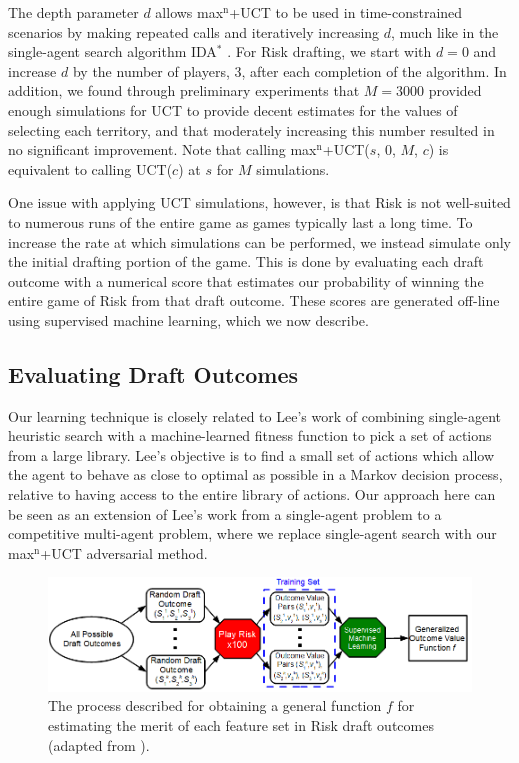 \documentclass[letterpaper]{article}
\numberwithin{equation}{section}
\numberwithin{theorem}{section}
\numberwithin{lemma}{section}
\numberwithin{df}{section}
\begin{document}
The depth parameter $d$ allows max$^\text{n}$+UCT to be used in time-constrained scenarios by making repeated calls and iteratively increasing $d$, much like in the single-agent search algorithm IDA$^*$ \cite{IdaStar}.  For Risk drafting, we start with $d = 0$ and increase $d$ by the number of players, 3, after each completion of the algorithm.  In addition, we found through preliminary experiments that $M = 3000$ provided enough simulations for UCT to provide decent estimates for the values of selecting each territory, and that moderately increasing this number resulted in no significant improvement.  Note that calling max$^\text{n}$+UCT($s$, $0$, $M$, $c$) is equivalent to calling UCT($c$) at $s$ for $M$ simulations.  

One issue with applying UCT simulations, however, is that Risk is not well-suited to numerous runs of the entire game as games typically last a long time.  To increase the rate at which simulations can be performed, we instead simulate only the initial drafting portion of the game.  This is done by evaluating each draft outcome with a numerical score that estimates our probability of winning the entire game of Risk from that draft outcome.  These scores are generated off-line using supervised machine learning, which we now describe.

\subsection{Evaluating Draft Outcomes}

Our learning technique is closely related to Lee's work \cite{GregLeeThesis} of combining single-agent heuristic search with a machine-learned fitness function to pick a set of actions from a large library.  Lee's objective is to find a small set of actions which allow the agent to behave as close to optimal as possible in a Markov decision process, relative to having access to the entire library of actions.  Our approach here can be seen as an extension of Lee's work from a single-agent problem to a competitive multi-agent problem, where we replace single-agent search with our max$^\text{n}$+UCT adversarial method. 

\begin{figure}[t]
	\centering
	\includegraphics[scale=0.5]{../ForPublication/figs/MachineLearner.png}
	\caption{The process described for obtaining a general function $f$ for estimating the merit of each feature set in Risk draft outcomes (adapted from \cite[Figure 5.1]{GregLeeThesis}).}
	\label{fig:MachLearn}
\end{figure} 
\end{document}
